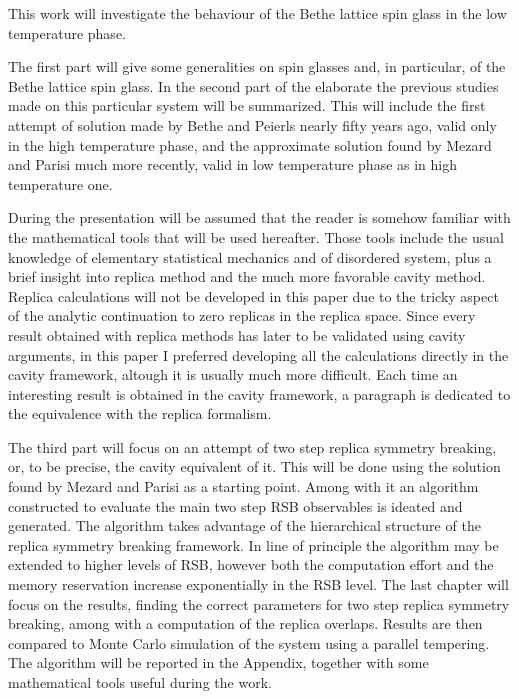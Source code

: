 

This work will investigate the behaviour of the Bethe lattice spin glass in the low temperature phase.

The first part will give some generalities on spin glasses and, in particular, of the Bethe lattice spin glass.
In the second part of the elaborate  the previous studies made on this particular system will be summarized. This will include the first attempt of solution made by Bethe and Peierls nearly fifty years ago, valid only in the high temperature phase, and the approximate solution found by Mezard and Parisi much more recently, valid in low temperature phase as in high temperature one.

During the presentation will be assumed that the reader is somehow familiar with the mathematical tools that will be used hereafter. Those tools include the usual knowledge of elementary statistical mechanics and of disordered system, plus a brief insight into replica method and the much more favorable cavity method.
Replica calculations will not be developed in this paper due to the tricky aspect of the analytic continuation to zero replicas in the replica space. Since every result obtained with replica methods has later to be validated using cavity arguments, in this paper I preferred developing all the calculations directly in the cavity framework, altough it is usually much more difficult.
Each time an interesting result is obtained in the cavity framework, a paragraph is dedicated to the equivalence with the replica formalism. 

The third part will focus on an attempt of two step replica symmetry breaking, or, to be precise, the cavity equivalent of it. This will be done using the solution found by Mezard and Parisi as a starting point. Among with it an algorithm constructed to evaluate the main two step RSB observables is ideated and generated. The algorithm takes advantage of the hierarchical structure of the replica symmetry breaking framework. In line of principle the algorithm may be extended to higher levels of RSB, however both the computation effort and the memory reservation increase exponentially in the RSB level.
The last chapter will focus on the results, finding the correct parameters for two step replica symmetry breaking, among with a computation of the replica overlaps. Results are then compared to Monte Carlo simulation of the system using a parallel tempering.
The algorithm will be reported in the Appendix, together with some mathematical tools useful during the work. 

